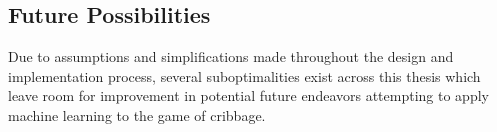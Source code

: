 
\subsection{Future Possibilities}
\label{sec:disc-future}

Due to assumptions and simplifications
made throughout the design and implementation process,
several suboptimalities exist across this thesis
which leave room for improvement in potential future endeavors
attempting to apply machine learning to the game of cribbage.








